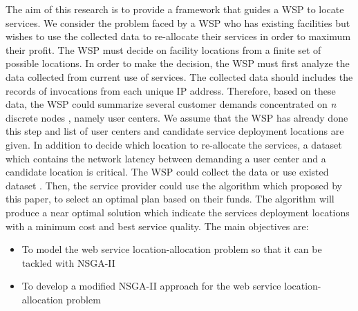 \documentclass{llncs}
\begin{document}
%
%

The aim of this research is to provide a framework that guides a WSP to locate services.
We consider the problem faced by a WSP who has existing facilities but wishes to use the collected data to re-allocate their services in order to maximum their profit.
The WSP must decide on facility locations from a finite set of possible locations. 
In order to make the decision, the WSP must first analyze the data collected from current use of services. 
The collected data should includes the records of invocations from each unique IP address.
Therefore, based on these data, the WSP could summarize several customer demands concentrated on \textit{n} discrete nodes \cite{Aboolian}, namely user centers. 
We assume that the WSP has already done this step and list of user centers and candidate service deployment locations are given.
In addition to decide which location to re-allocate the services, a dataset which contains the network latency between demanding a user center and a candidate location is critical. 
The WSP could collect the data or use existed dataset  \cite{6076756} \cite{5552800}. 
Then, the service provider could use the algorithm which proposed by this paper, to select an optimal plan based on their funds. 
The algorithm will produce a near optimal solution which indicate the services deployment locations with a minimum cost and best service quality.
The main objectives are:
\begin{itemize}
	\item To model the web service location-allocation problem so that it can be tackled with NSGA-II
	\item To develop a modified NSGA-II approach for the web service location-allocation problem
\end{itemize}
\end{document}
